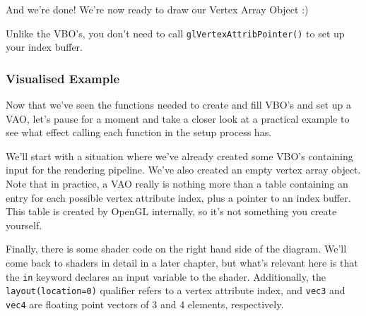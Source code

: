 And we're done! We're now ready to draw our Vertex Array Object :)

Unlike the VBO's, you don't need to call \texttt{glVertexAttribPointer()} to set up your index buffer.

\newpage
\subsubsection{Visualised Example}


Now that we've seen the functions needed to create and fill VBO's and set up a VAO, let's pause for a moment and take a closer look at a practical example to see what effect calling each function in the setup process has.

We'll start with a situation where we've already created some VBO's containing input for the rendering pipeline. We've also created an empty vertex array object. Note that in practice, a VAO really is nothing more than a table containing an entry for each possible vertex attribute index, plus a pointer to an index buffer. This table is created by OpenGL internally, so it's not something you create yourself. 

Finally, there is some shader code on the right hand side of the diagram. We'll come back to shaders in detail in a later chapter, but what's relevant here is that the \texttt{in} keyword declares an input variable to the shader. Additionally, the \texttt{layout(location=0)} qualifier refers to a vertex attribute index, and \texttt{vec3} and \texttt{vec4} are floating point vectors of 3 and 4 elements, respectively. 

